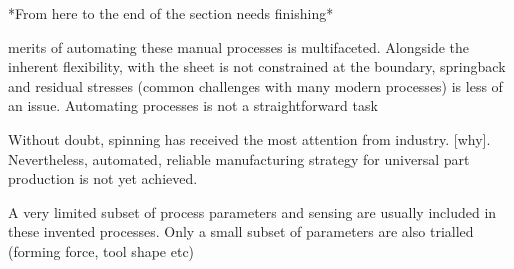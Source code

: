 \vspace{4em}
*From here to the end of the section needs finishing*
\vspace{4em}

merits of automating these manual processes is multifaceted. Alongside the inherent flexibility, with the sheet is not constrained at the boundary, springback and residual stresses (common challenges with many modern processes) is less of an issue. Automating processes is not a straightforward task

Without doubt, spinning has received the most attention from industry. [why]. Nevertheless, automated, reliable manufacturing strategy for universal part production is not yet achieved. 

A very limited subset of process parameters and sensing are usually included in these invented processes. Only a small subset of parameters are also trialled (forming force, tool shape etc)


 

 



